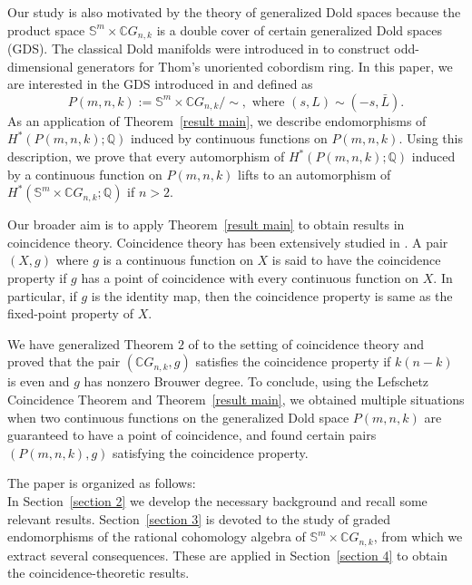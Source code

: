 \documentclass{amsart}
\newcommand{\thmref}[1]{Theorem~\ref{#1}}
\newcommand{\secref}[1]{Section~\ref{#1}}
\begin{document}
	Our study is also motivated by the theory of generalized Dold spaces because the product space $\mathbb S^m \times \mathbb CG_{n,k}$ is a double cover of certain  generalized Dold spaces (GDS). %
	The classical Dold manifolds were introduced in \cite{dold} to construct odd-dimensional generators for Thom's unoriented cobordism ring. In this paper, we are interested in the GDS introduced in \cite{nath-sankaran} and defined as  %
	\[
	P(m,n,k):=\mathbb S^m\times \mathbb CG_{n,k}/\!\!\sim, \text { where } (s,L)\sim (-s,\bar L).
	\]
	As an application of \thmref{result main}, we describe endomorphisms of $H^*(P(m,n,k);\mathbb{Q})$ induced by continuous functions on $P(m,n,k)$. Using this description, we prove that every automorphism of $H^*(P(m,n,k);\mathbb{Q})$ induced by a continuous function on $P(m,n,k)$ lifts to an automorphism of $H^*(\mathbb S^m\times \mathbb CG_{n,k}; \mathbb{Q})$ if $n>2$. 
	
	Our broader aim is to apply \thmref{result main} to obtain results in coincidence theory. Coincidence theory has been extensively studied in \cite{hoffman-noncoin, glover-homer coin, wong}. %
	A pair $(X,g)$ where $g$ is a continuous function on $X$ is said to have the coincidence property if $g$ has a point of coincidence with every continuous function on $X$. In particular, if $g$ is the identity map, then the coincidence property is same as the fixed-point property of $X$.
	
	We have generalized Theorem $2$ of \cite{glover-homer} to the setting of coincidence theory and proved that the pair $(\mathbb{C}G_{n,k},g)$ satisfies the coincidence property if $k(n-k)$ is even and $g$ has nonzero Brouwer degree.
	To conclude, using the Lefschetz Coincidence Theorem and \thmref{result main}, we obtained multiple situations when two continuous functions on the generalized Dold space $P(m,n,k)$ are guaranteed to have a point of coincidence, and found certain pairs $(P(m,n,k),g)$ satisfying the coincidence property.
	
	The paper is organized as follows: \\
	In \secref{section 2} we develop the necessary background and recall some relevant results. \secref{section 3} is devoted to the study of graded endomorphisms of the rational cohomology algebra of $\mathbb S^{m}\times \mathbb C G_{n,k}$, from which we extract several consequences. These are applied in \secref{section 4} to obtain the coincidence-theoretic results.
	
\end{document}
